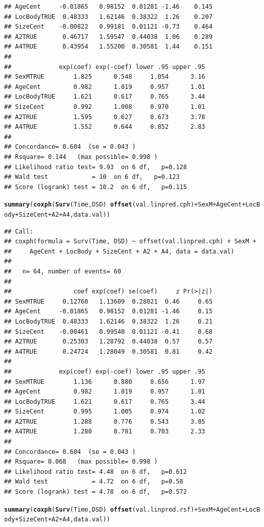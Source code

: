\documentclass{article}\usepackage[]{graphicx}\usepackage[]{color}
\makeatletter
\newcommand{\hlopt}[1]{\textcolor[rgb]{0,0,0}{#1}}%
\newcommand{\hlstd}[1]{\textcolor[rgb]{0.345,0.345,0.345}{#1}}%
\newcommand{\hlkwd}[1]{\textcolor[rgb]{0.737,0.353,0.396}{\textbf{#1}}}%
\newenvironment{kframe}{%
 \def\at@end@of@kframe{}%
 \ifinner\ifhmode%
  \def\at@end@of@kframe{\end{minipage}}%
  \begin{minipage}{\columnwidth}%
 \fi\fi%
 \def\FrameCommand##1{\hskip\@totalleftmargin \hskip-\fboxsep
 \colorbox{shadecolor}{##1}\hskip-\fboxsep
     \hskip-\linewidth \hskip-\@totalleftmargin \hskip\columnwidth}%
 \MakeFramed {\advance\hsize-\width
   \@totalleftmargin\z@ \linewidth\hsize
   \@setminipage}}%
 {\par\unskip\endMakeFramed%
 \at@end@of@kframe}
\newenvironment{knitrout}{}{} %
\makeatother
\begin{document}
\begin{knitrout}
\begin{kframe}
\begin{verbatim}
## AgeCent     -0.01865   0.98152  0.01281 -1.46    0.145
## LocBodyTRUE  0.48333   1.62146  0.38322  1.26    0.207
## SizeCent    -0.00822   0.99181  0.01121 -0.73    0.464
## A2TRUE       0.46717   1.59547  0.44038  1.06    0.289
## A4TRUE       0.43954   1.55200  0.30581  1.44    0.151
## 
##             exp(coef) exp(-coef) lower .95 upper .95
## SexMTRUE        1.825      0.548     1.054      3.16
## AgeCent         0.982      1.019     0.957      1.01
## LocBodyTRUE     1.621      0.617     0.765      3.44
## SizeCent        0.992      1.008     0.970      1.01
## A2TRUE          1.595      0.627     0.673      3.78
## A4TRUE          1.552      0.644     0.852      2.83
## 
## Concordance= 0.604  (se = 0.043 )
## Rsquare= 0.144   (max possible= 0.998 )
## Likelihood ratio test= 9.93  on 6 df,   p=0.128
## Wald test            = 10  on 6 df,   p=0.123
## Score (logrank) test = 10.2  on 6 df,   p=0.115
\end{verbatim}
\begin{alltt}
\hlkwd{summary}\hlstd{(}\hlkwd{coxph}\hlstd{(}\hlkwd{Surv}\hlstd{(Time, DSD)} \hlopt{~} \hlkwd{offset}\hlstd{(val.linpred.cph)} \hlopt{+} \hlstd{SexM} \hlopt{+} \hlstd{AgeCent} \hlopt{+} \hlstd{LocBody} \hlopt{+} \hlstd{SizeCent} \hlopt{+} \hlstd{A2} \hlopt{+} \hlstd{A4, data.val))}
\end{alltt}
\begin{verbatim}
## Call:
## coxph(formula = Surv(Time, DSD) ~ offset(val.linpred.cph) + SexM + 
##     AgeCent + LocBody + SizeCent + A2 + A4, data = data.val)
## 
##   n= 64, number of events= 60 
## 
##                 coef exp(coef) se(coef)     z Pr(>|z|)
## SexMTRUE     0.12760   1.13609  0.28021  0.46     0.65
## AgeCent     -0.01865   0.98152  0.01281 -1.46     0.15
## LocBodyTRUE  0.48333   1.62146  0.38322  1.26     0.21
## SizeCent    -0.00461   0.99540  0.01121 -0.41     0.68
## A2TRUE       0.25303   1.28792  0.44038  0.57     0.57
## A4TRUE       0.24724   1.28049  0.30581  0.81     0.42
## 
##             exp(coef) exp(-coef) lower .95 upper .95
## SexMTRUE        1.136      0.880     0.656      1.97
## AgeCent         0.982      1.019     0.957      1.01
## LocBodyTRUE     1.621      0.617     0.765      3.44
## SizeCent        0.995      1.005     0.974      1.02
## A2TRUE          1.288      0.776     0.543      3.05
## A4TRUE          1.280      0.781     0.703      2.33
## 
## Concordance= 0.604  (se = 0.043 )
## Rsquare= 0.068   (max possible= 0.998 )
## Likelihood ratio test= 4.48  on 6 df,   p=0.612
## Wald test            = 4.72  on 6 df,   p=0.58
## Score (logrank) test = 4.78  on 6 df,   p=0.572
\end{verbatim}
\begin{alltt}
\hlkwd{summary}\hlstd{(}\hlkwd{coxph}\hlstd{(}\hlkwd{Surv}\hlstd{(Time, DSD)} \hlopt{~} \hlkwd{offset}\hlstd{(val.linpred.rsf)} \hlopt{+} \hlstd{SexM} \hlopt{+} \hlstd{AgeCent} \hlopt{+} \hlstd{LocBody} \hlopt{+} \hlstd{SizeCent} \hlopt{+} \hlstd{A2} \hlopt{+} \hlstd{A4, data.val))}
\end{alltt}



\end{kframe}
\end{knitrout}
\end{document}
